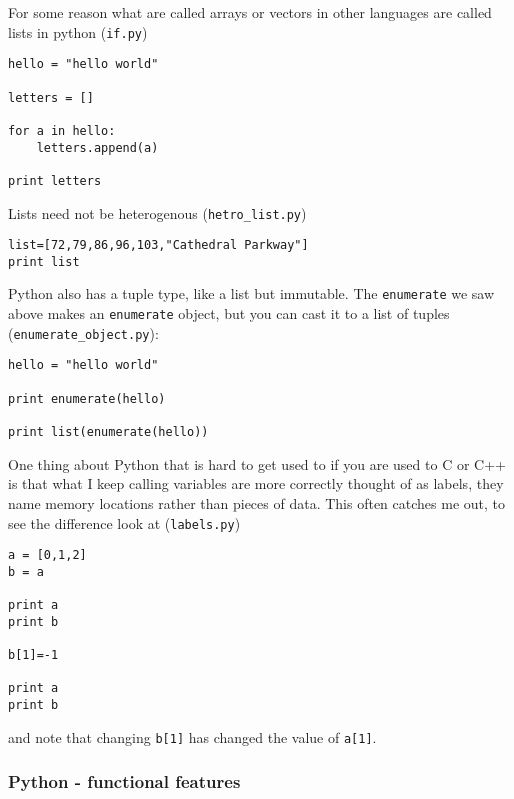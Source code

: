 \documentclass[11pt,a4paper]{scrartcl}
\begin{document}
For some reason what are called arrays or vectors in other languages
are called lists in python  (\texttt{if.py})
\begin{lstlisting}[numbers=right]
hello = "hello world"

letters = []

for a in hello:
    letters.append(a)

print letters
\end{lstlisting}
Lists need not be heterogenous  (\texttt{hetro\_list.py})
\begin{lstlisting}[numbers=right]
list=[72,79,86,96,103,"Cathedral Parkway"]
print list
\end{lstlisting}
Python also has a tuple type, like a list but immutable. The
\texttt{enumerate} we saw above makes an \texttt{enumerate} object,
but you can cast it to a list of tuples (\texttt{enumerate\_object.py}):
\begin{lstlisting}[numbers=right]
hello = "hello world"

print enumerate(hello) 

print list(enumerate(hello)) 
\end{lstlisting}

One thing about Python that is hard to get used to if you are used to
C or C++ is that what I keep calling variables are more correctly
thought of as labels, they name memory locations rather than pieces of
data. This often catches me out, to see the difference look at
(\texttt{labels.py})
\begin{lstlisting}[numbers=right]
a = [0,1,2]
b = a

print a
print b

b[1]=-1

print a
print b
\end{lstlisting}
and note that changing \texttt{b[1]} has changed the value of \texttt{a[1]}.

\subsubsection*{Python - functional features}
\end{document}

